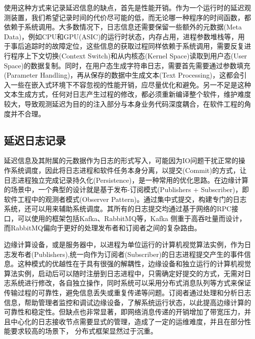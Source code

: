 \documentclass[master]{shtthesis}
\begin{document}
使用这种方式来记录延迟信息的缺点，首先是性能开销。作为一个运行时的延迟观测装置，我们希望记录时间的代价尽可能的低，而无论哪一种程序的时间函数，都依赖于系统调用。大多数情况下，日志信息还需要保留一些额外的元数据(Meta Data)，例如CPU和GPU(ASIC)的运行时状态，内存占用，进程参数堆栈等，用于事后追踪时的故障定位，这些信息的获取过程同样依赖于系统调用，需要反复进行程序上下文切换(Context Switch)和从内核态(Kernel Space)读取到用户态(User Space)的数据复制。同时，在用户态生成字符串日志，需要首先需要通过参数填充(Parameter Handling)，再从保存的数据中生成文本(Text Processing)，这都会引入一些在嵌入式环境下不容忽视的性能开销，应尽量优化和避免。另一不足是这种文本生成方式，任何对日志产生过程的修改，都必须重新编译整个软件，维护难度较大，导致观测延迟为目的的注入部分与本身业务代码深度耦合，在软件工程的角度并不合理。

\subsection{延迟日志记录}\label{延迟日志记录}
延迟信息及其附属的元数据作为日志的形式写入，可能因为IO问题干扰正常的操作系统调度，因此将日志进程和软件任务本身分离，以提交(Commit)的方式，让日志进程独立完成记录持久化(Persistence)，是一种常用的优化思路。在边缘计算的场景中，一个典型的设计就是基于发布-订阅模式(Publishers + Subscriber)，即软件工程中的观测者模式(Observer Pattern)。通过集中式提交，构建专门的日志系统，还可以用来辅助系统调度。其所有的日志提交均通过基于网络的RPC接口，可以使用的框架包括Kafka\cite{kreps2011kafka}、RabbitMQ等，Kafka 侧重于高吞吐量而设计，而RabbitMQ偏向于更好的处理发布者和订阅者之间的复杂路由\cite{dobbelaere2017kafka}。


边缘计算设备，或是服务器中，以进程为单位运行的计算机视觉算法实例，作为日志发布者(Publishers),统一向作为订阅者(Subscriber)的日志进程提交产生的事件信息。这种模式的优越性在于具有很强的解耦性，边缘设备和独立运行的计算机视觉算法实例，启动后可以随时注册到日志进程中，只需确定好提交的方式，无需对日志系统进行修改，各自独立操作，同时系统可以采用分布式消息队列等方式来保证传输过程的可靠性，避免信息丢失或重复传递等问题。订阅者通过处理和分析日志信息，帮助管理者监控和调试边缘设备，了解系统运行状态，以此提高边缘计算的可靠性和稳定性。但缺点也非常显著，即网络消息传递的开销增加了带宽压力，并且中心化的日志接收节点需要显式的管理，造成了一定的运维难度，并且在部分性能要求较高的场景下，
分布式框架显然过于沉重。
\end{document}
